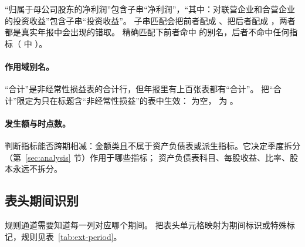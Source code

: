 \begin{example}[精确匹配避免的误配]
“归属于母公司股东的净利润”包含子串“净利润”，“其中：对联营企业和合营企业的投资收益”包含子串“投资收益”。
子串匹配会把前者配成 、把后者配成 ，两者都是真实年报中会出现的错取。
精确匹配下前者命中  的别名，后者不命中任何指标（ 中 ）。
\end{example}

\paragraph{作用域别名。}
“合计”是非经常性损益表的合计行，但年报里有上百张表都有“合计”。 把“合计”限定为只在标题含“非经常性损益”的表中生效：
 为空， 为 。

\paragraph{发生额与时点数。}
 判断指标能否跨期相减：金额类且不属于资产负债表或派生指标。它决定季度拆分（第~\ref{sec:analysis} 节）作用于哪些指标；
资产负债表科目、每股收益、比率、股本永远不拆分。

\subsection{表头期间识别}
\label{sec:ext-period}

规则通道需要知道每一列对应哪个期间。 把表头单元格映射为期间标识或特殊标记，规则见表~\ref{tab:ext-period}。

